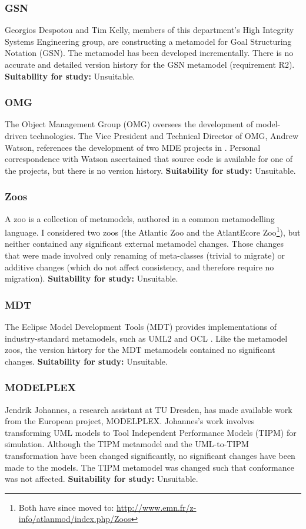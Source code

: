 \subsubsection{GSN}
\label{par:gsn}
Georgios Despotou and Tim Kelly, members of this department's High Integrity Systems Engineering group, are constructing a metamodel for Goal Structuring Notation (GSN). The metamodel has been developed incrementally. There is no accurate and detailed version history for the GSN metamodel (requirement R2). \textbf{Suitability for study:} Unsuitable.

\subsubsection{OMG}
\label{par:omg}
The Object Management Group (OMG) \cite{omg} oversees the development of model-driven technologies. The Vice President and Technical Director of OMG, Andrew Watson, references the development of two MDE projects in \cite{watson08mdahistory}. Personal correspondence with Watson ascertained that source code is available for one of the projects, but there is no version history. \textbf{Suitability for study:} Unsuitable.

\subsubsection{Zoos}
\label{par:zoos}
A zoo is a collection of metamodels, authored in a common metamodelling language. I considered two zoos (the Atlantic Zoo and the AtlantEcore Zoo\footnote{Both have since moved to: \url{http://www.emn.fr/z-info/atlanmod/index.php/Zoos}}), but neither contained any significant external metamodel changes. Those changes that were made involved only renaming of meta-classes (trivial to migrate) or additive changes (which do not affect consistency, and therefore require no migration). \textbf{Suitability for study:} Unsuitable.

\subsubsection{MDT}
The Eclipse Model Development Tools (MDT) \cite{mdt} provides implementations of industry-standard metamodels, such as UML2 \cite{uml212} and OCL \cite{ocl2}. Like the metamodel zoos, the version history for the MDT metamodels contained no significant changes. \textbf{Suitability for study:} Unsuitable.

\subsubsection{MODELPLEX}
Jendrik Johannes, a research assistant at TU Dresden, has made available work from the European project, MODELPLEX. Johannes's work involves transforming UML models to Tool Independent Performance Models (TIPM) for simulation. Although the TIPM metamodel and the UML-to-TIPM transformation have been changed significantly, no significant changes have been made to the models. The TIPM metamodel was changed such that conformance was not affected. \textbf{Suitability for study:} Unsuitable.

